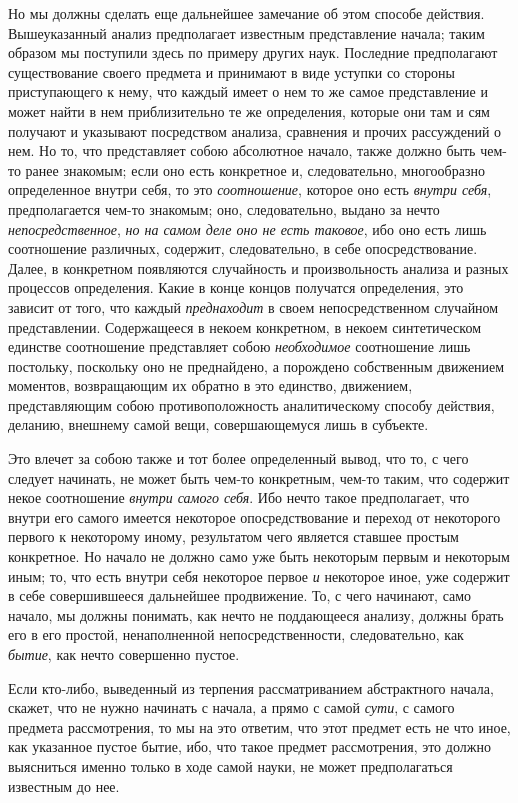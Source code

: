 Но мы должны сделать еще дальнейшее замечание об этом способе действия.
Вышеуказанный анализ предполагает известным представление начала; таким
образом мы поступили здесь по примеру других наук. Последние предполагают
существование своего предмета и принимают в виде уступки со стороны
приступающего к нему, что каждый имеет о нем то же самое представление и
может найти в нем приблизительно те же определения, которые они там и сям
получают и указывают посредством анализа, сравнения и прочих рассуждений о
нем. Но то, что представляет собою абсолютное начало, также должно быть
чем-то ранее знакомым; если оно есть конкретное и, следовательно,
многообразно определенное внутри себя, то это
{\em соотношение}, которое оно есть
{\em внутри себя}, предполагается чем-то знакомым; оно,
следовательно, выдано за нечто {\em непосредственное},
{\em но на самом деле оно не есть таковое}, ибо оно
есть лишь соотношение различных, содержит, следовательно, в себе
опосредствование. Далее, в конкретном появляются случайность и
произвольность анализа и разных процессов определения. Какие в конце концов
получатся определения, это зависит от того, что каждый
{\em преднаходит} в своем непосредственном случайном
представлении. Содержащееся в некоем конкретном, в некоем синтетическом
единстве соотношение представляет собою
{\em необходимое} соотношение лишь постольку, поскольку
оно не преднайдено, а порождено собственным движением моментов,
возвращающим их обратно в это единство, движением, представляющим собою
противоположность аналитическому способу действия, деланию, внешнему самой
вещи, совершающемуся лишь в субъекте.

Это влечет за собою также и тот более определенный вывод, что то, с чего
следует начинать, не может быть чем-то конкретным, чем-то таким, что
содержит некое соотношение {\em внутри самого себя}.
Ибо нечто такое предполагает, что внутри его самого имеется некоторое
опосредствование и переход от некоторого первого к некоторому иному,
результатом чего является ставшее простым конкретное. Но начало не должно
само уже быть некоторым первым и некоторым иным; то, что есть внутри себя
некоторое первое {\em и} некоторое иное, уже содержит
в себе совершившееся дальнейшее продвижение. То, с чего начинают, само
начало, мы должны понимать, как нечто не поддающееся анализу, должны брать
его в его простой, ненаполненной непосредственности, следовательно, как
{\em бытие}, как нечто совершенно пустое.

Если кто-либо, выведенный из терпения рассматриванием абстрактного начала,
скажет, что не нужно начинать с начала, а прямо с самой
{\em сути}, с самого предмета рассмотрения, то мы на
это ответим, что этот предмет есть не что иное, как указанное пустое бытие,
ибо, что такое предмет рассмотрения, это должно выясниться именно только в
ходе самой науки, не может предполагаться известным до нее.

